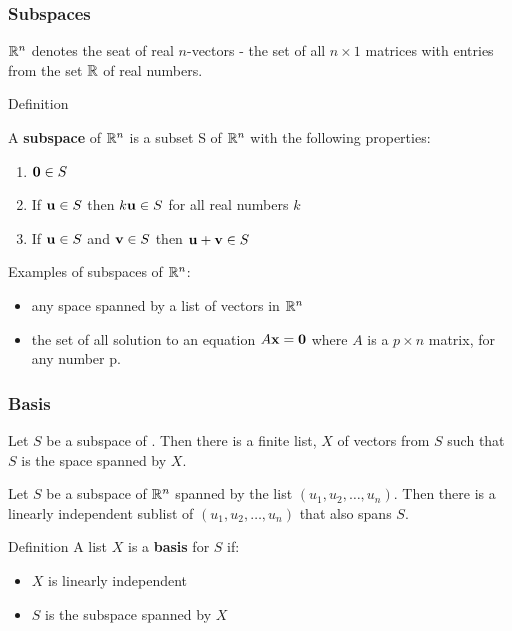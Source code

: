 \documentclass{beamer}
\begin{document}
\begin{frame}
  \frametitle{Subspaces}

$\mathbb{R}^n$  denotes the seat of real $n$-vectors - the set of all $n \times 1$ matrices with entries from the set $\mathbb{R}$ of real numbers.
\medskip

\begin{block}{Definition}

A \textbf{subspace} of $\mathbb{R}^n$ is a subset S of $\mathbb{R}^n$ with the following properties:
\begin{enumerate}
	\item $\mathbf{0} \in S$
	\item If $\mathbf{u} \in S$ then $k\mathbf{u} \in S$ for all real numbers $k$
	\item If $\mathbf{u} \in S$ and  $\mathbf{v} \in S$ then $\mathbf{u} + \mathbf{v} \in S$
\end{enumerate}

\end{block}

Examples of subspaces of $\mathbb{R}^n$:
\begin{itemize}
	\item any space spanned by a list of vectors in $\mathbb{R}^n$
	\item the set of all solution to an equation $A\mathbf{x} = \mathbf{0}$ where $A$ is a $p \times n$ matrix, for any number p.
\end{itemize}

\end{frame}

\begin{frame}
  \frametitle{Basis}

Let $S$ be a subspace of \RealN.  Then there is a finite list, $X$ of vectors from $S$ such that $S$ is the space spanned by $X$.
\medskip

Let $S$ be a subspace of $\mathbb{R}^n$ spanned by the list $(u_1, u_2, \ldots, u_n)$. Then  there is a linearly independent sublist of $(u_1, u_2, \ldots, u_n)$ that also spans $S$.
\medskip

\begin{block}{Definition}
A list $X$ is a \textbf{basis} for $S$ if:
\begin{itemize}
\item $X$ is linearly independent
\item $S$ is the subspace spanned by $X$
\end{itemize}
\end{block}

\end{frame}
\end{document}
